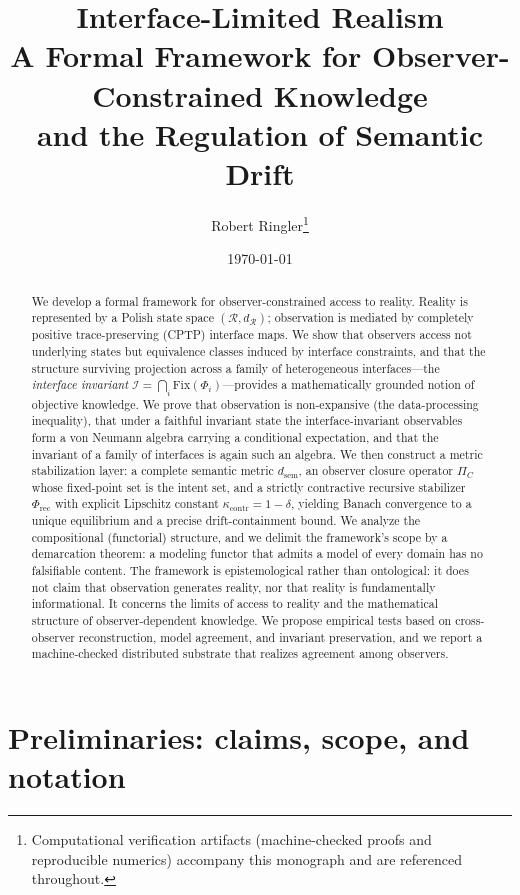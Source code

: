 \documentclass[11pt]{report}
\title{\bfseries Interface-Limited Realism\\[2mm]
\large A Formal Framework for Observer-Constrained Knowledge\\
and the Regulation of Semantic Drift}
\author{Robert Ringler\thanks{Computational verification artifacts (machine-checked
proofs and reproducible numerics) accompany this monograph and are referenced
throughout.}}
\date{\today}
\theoremstyle{plain}
\theoremstyle{definition}
\theoremstyle{remark}
\newcommand{\Real}{\mathcal{R}}
\newcommand{\Iint}{\mathcal{I}}
\newcommand{\Fix}{\mathrm{Fix}}
\newcommand{\dsem}{d_{\mathrm{sem}}}
\newcommand{\Phirec}{\Phi_{\mathrm{rec}}}
\newcommand{\PiC}{\Pi_{C}}
\newcommand{\kcontr}{\kappa_{\mathrm{contr}}}
\begin{document}
\maketitle

\begin{abstract}
We develop a formal framework for observer-constrained access to reality. Reality
is represented by a Polish state space $(\Real, d_\Real)$; observation is mediated
by completely positive trace-preserving (CPTP) interface maps. We show that
observers access not underlying states but equivalence classes induced by interface
constraints, and that the structure surviving projection across a family of
heterogeneous interfaces---the \emph{interface invariant}
$\Iint=\bigcap_i \Fix(\Phi_i)$---provides a mathematically grounded notion of
objective knowledge. We prove that observation is non-expansive (the data-processing
inequality), that under a faithful invariant state the interface-invariant
observables form a von Neumann algebra carrying a conditional expectation, and that
the invariant of a family of interfaces is again such an algebra. We then construct
a metric stabilization layer: a complete semantic metric $\dsem$, an observer
closure operator $\PiC$ whose fixed-point set is the intent set, and a strictly
contractive recursive stabilizer $\Phirec$ with explicit Lipschitz constant
$\kcontr=1-\delta$, yielding Banach convergence to a unique equilibrium and a precise
drift-containment bound. We analyze the compositional (functorial) structure, and we
delimit the framework's scope by a demarcation theorem: a modeling functor that
admits a model of every domain has no falsifiable content. The framework is
epistemological rather than ontological: it does not claim that observation generates
reality, nor that reality is fundamentally informational. It concerns the limits of
access to reality and the mathematical structure of observer-dependent knowledge. We
propose empirical tests based on cross-observer reconstruction, model agreement, and
invariant preservation, and we report a machine-checked distributed substrate that
realizes agreement among observers.
\end{abstract}

\tableofcontents

\chapter*{Preliminaries: claims, scope, and notation}
\end{document}
